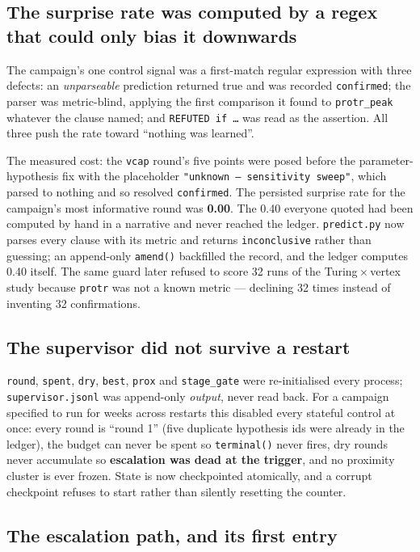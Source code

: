 \documentclass[11pt]{article}
\begin{document}
\subsection{The surprise rate was computed by a regex that could only bias it downwards}

The campaign's one control signal was a first-match regular expression with three defects: an
\emph{unparseable} prediction returned true and was recorded \texttt{confirmed}; the parser was
metric-blind, applying the first comparison it found to \texttt{protr\_peak} whatever the clause
named; and \texttt{REFUTED if \ldots} was read as the assertion. All three push the rate toward
``nothing was learned''.

The measured cost: the \texttt{vcap} round's five points were posed before the parameter-hypothesis
fix with the placeholder \texttt{"unknown -- sensitivity sweep"}, which parsed to nothing and so
resolved \texttt{confirmed}. The persisted surprise rate for the campaign's most informative round
was \textbf{0.00}. The 0.40 everyone quoted had been computed by hand in a narrative and never
reached the ledger. \texttt{predict.py} now parses every clause with its metric and returns
\texttt{inconclusive} rather than guessing; an append-only \texttt{amend()} backfilled the record,
and the ledger computes 0.40 itself. The same guard later refused to score 32 runs of the
Turing\,$\times$\,vertex study because \texttt{protr} was not a known metric --- declining 32 times
instead of inventing 32 confirmations.

\subsection{The supervisor did not survive a restart}

\texttt{round}, \texttt{spent}, \texttt{dry}, \texttt{best}, \texttt{prox} and \texttt{stage\_gate}
were re-initialised every process; \texttt{supervisor.jsonl} was append-only \emph{output}, never
read back. For a campaign specified to run for weeks across restarts this disabled every stateful
control at once: every round is ``round 1'' (five duplicate hypothesis ids were already in the
ledger), the budget can never be spent so \texttt{terminal()} never fires, dry rounds never
accumulate so \textbf{escalation was dead at the trigger}, and no proximity cluster is ever frozen.
State is now checkpointed atomically, and a corrupt checkpoint refuses to start rather than
silently resetting the counter.

\subsection{The escalation path, and its first entry}
\end{document}
